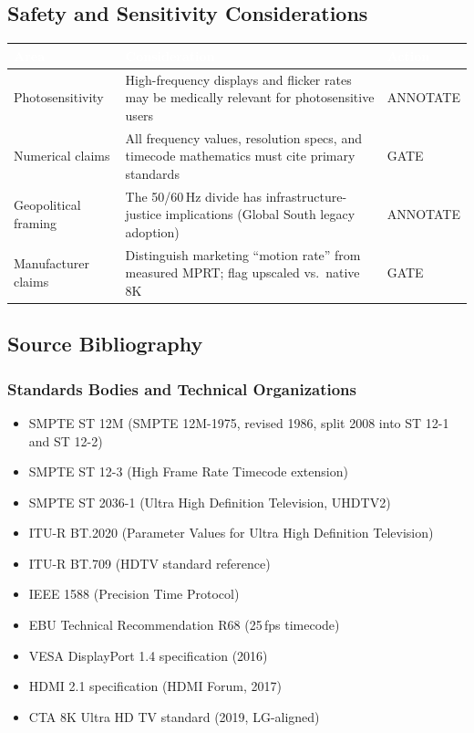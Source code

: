 \documentclass[11pt,letterpaper]{article}
\newcommand{\tableheader}[1]{\textbf{\sffamily\textcolor{white}{#1}}}
\begin{document}
\subsection{Safety and Sensitivity Considerations}

\begin{center}
\begin{tabularx}{\textwidth}{L{3cm}XC{2cm}}
\toprule
{}
\tableheader{Area} & \tableheader{Consideration} & \tableheader{Action} \\
\midrule
Photosensitivity & High-frequency displays and flicker rates may be medically relevant for photosensitive users & ANNOTATE \\
Numerical claims & All frequency values, resolution specs, and timecode mathematics must cite primary standards & GATE \\
Geopolitical framing & The 50/60\,Hz divide has infrastructure-justice implications (Global South legacy adoption) & ANNOTATE \\
Manufacturer claims & Distinguish marketing ``motion rate'' from measured MPRT; flag upscaled vs.\ native 8K & GATE \\
\bottomrule
\end{tabularx}
\end{center}

\subsection{Source Bibliography}

\subsubsection{Standards Bodies and Technical Organizations}

\begin{itemize}[leftmargin=*]
  \item SMPTE ST 12M (SMPTE 12M-1975, revised 1986, split 2008 into ST 12-1 and ST 12-2)
  \item SMPTE ST 12-3 (High Frame Rate Timecode extension)
  \item SMPTE ST 2036-1 (Ultra High Definition Television, UHDTV2)
  \item ITU-R BT.2020 (Parameter Values for Ultra High Definition Television)
  \item ITU-R BT.709 (HDTV standard reference)
  \item IEEE 1588 (Precision Time Protocol)
  \item EBU Technical Recommendation R68 (25\,fps timecode)
  \item VESA DisplayPort 1.4 specification (2016)
  \item HDMI 2.1 specification (HDMI Forum, 2017)
  \item CTA 8K Ultra HD TV standard (2019, LG-aligned)
\end{itemize}
\end{document}
